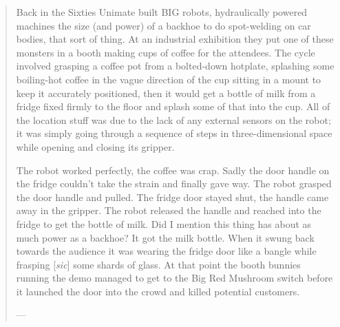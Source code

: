 \documentclass[a4paper]{article}
\begin{document}
\medskip
\begin{quote}
Back in the Sixties Unimate built BIG robots, hydraulically powered
machines the size (and power) of a backhoe to do spot-welding on car
bodies, that sort of thing. At an industrial exhibition they put one of
these monsters in a booth making cups of coffee for the attendees. The
cycle involved grasping a coffee pot from a bolted-down hotplate,
splashing some boiling-hot coffee in the vague direction of the cup
sitting in a mount to keep it accurately positioned, then it would get a
bottle of milk from a fridge fixed firmly to the floor and splash some
of that into the cup. All of the location stuff was due to the lack of
any external sensors on the robot; it was simply going through a sequence
of steps in three-dimensional space while opening and closing its gripper.

The robot worked perfectly, the coffee was crap. Sadly the door handle
on the fridge couldn't take the strain and finally gave way. The
robot grasped the door handle and pulled. The fridge door stayed shut,
the handle came away in the gripper. The robot released the handle and
reached into the fridge to get the bottle of milk. Did I mention this
thing has about as much power as a backhoe? It got the milk bottle. When
it swung back towards the audience it was wearing the fridge door like
a bangle while frasping [{\it sic}] some shards of glass. At that point the booth
bunnies running the demo managed to get to the Big Red Mushroom switch
before it launched the door into the crowd and killed potential customers.

---\citet{nojay2010}
\end{quote}
\end{document}

